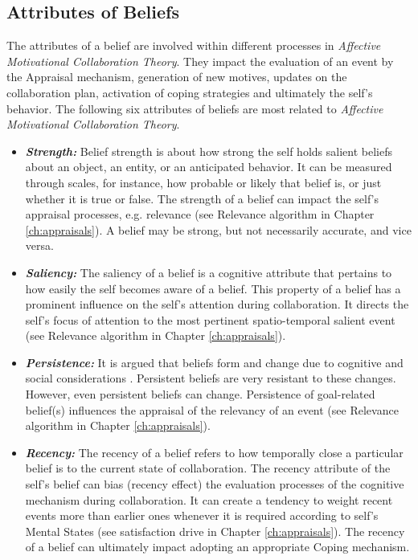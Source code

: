 \documentclass[12pt]{report}
\begin{document}
\subsection{Attributes of Beliefs}

The attributes of a belief are involved within different processes in
\textit{Affective Motivational Collaboration Theory}. They impact the evaluation
of an event by the Appraisal mechanism, generation of new motives, updates on
the collaboration plan, activation of coping strategies and ultimately the self's
behavior. The following six attributes of beliefs are most related to
\textit{Affective Motivational Collaboration Theory}.

\begin{itemize}
  \item \textbf{\textit{Strength:}} Belief strength is about how strong the self
  holds salient beliefs about an object, an entity, or an anticipated behavior.
  It can be measured through scales, for instance, how probable or likely that
  belief is, or just whether it is true or false. The strength of a belief can
  impact the self's appraisal processes, e.g. relevance (see Relevance algorithm
  in Chapter \ref{ch:appraisals}). A belief may be strong, but not necessarily
  accurate, and vice versa.
  
  \item \textbf{\textit{Saliency:}} The saliency of a belief is a cognitive
  attribute that pertains to how easily the self becomes aware of a belief.
  This property of a belief has a prominent influence on the self's attention
  during collaboration. It directs the self's focus of attention to the most
  pertinent spatio-temporal salient event (see Relevance algorithm in Chapter
  \ref{ch:appraisals}).
  
  \item \textbf{\textit{Persistence:}} It is argued that beliefs form and change
  due to cognitive and social considerations \cite{carley:belief-persistence}.
  Persistent beliefs are very resistant to these changes. However, even
  persistent beliefs can change. Persistence of goal-related belief(s)
  influences the appraisal of the relevancy of an event (see Relevance
  algorithm in Chapter \ref{ch:appraisals}).
  
  \item \textbf{\textit{Recency:}} The recency of a belief refers to how
  temporally close a particular belief is to the current state of collaboration.
  The recency attribute of the self's belief can bias (recency effect) the
  evaluation processes of the cognitive mechanism during collaboration. It can
  create a tendency to weight recent events more than earlier ones whenever it
  is required according to self's Mental States (see satisfaction drive in
  Chapter \ref{ch:appraisals}). The recency of a belief can ultimately impact
  adopting an appropriate Coping mechanism.
  

\end{itemize}
\end{document}
